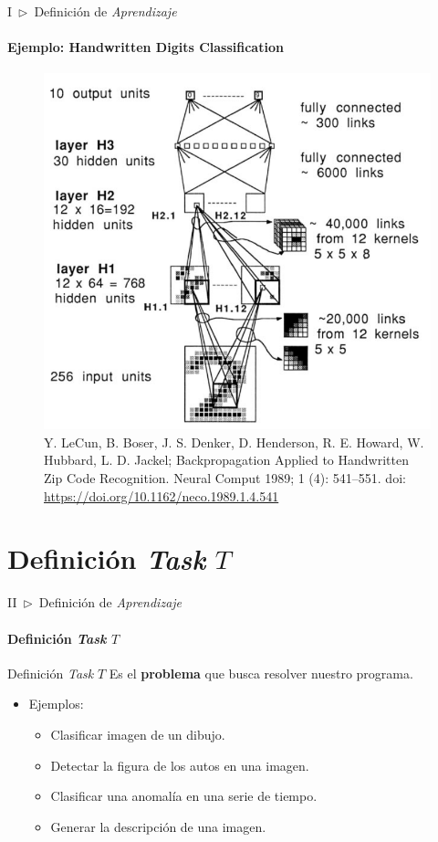 \documentclass[xcolor=dvipsnames]{beamer}
\begin{document}
    \begin{frame}{I~$\rhd$~Definición de \textit{Aprendizaje}}
    \framesubtitle{Ejemplo: Handwritten Digits Classification}
       \begin{figure}
           \centering
           \includegraphics[width=0.5\linewidth]{imgs/sec1/0899-7667-img2.png}
           \caption{\scriptsize{Y. LeCun, B. Boser, J. S. Denker, D. Henderson, R. E. Howard, W. Hubbard, L. D. Jackel; Backpropagation Applied to Handwritten Zip Code Recognition. Neural Comput 1989; 1 (4): 541–551. doi: \url{https://doi.org/10.1162/neco.1989.1.4.541}}}
       \end{figure}
    \end{frame}

    \section{Definición \textit{Task} \( T \)}
    \begin{frame}{II~$\rhd$~Definición de \textit{Aprendizaje}}
    \framesubtitle{Definición \textit{Task} \( T \)}
        \begin{block}{Definición \textit{Task} \( T \)}
        Es el \textbf{problema} que busca resolver nuestro programa.
        \end{block}
        \vspace{5mm}
        \begin{itemize}
            \item Ejemplos:
            \begin{itemize}
                \item Clasificar imagen de un dibujo.
                \item Detectar la figura de los autos en una imagen.
                \item Clasificar una anomalía en una serie de tiempo.
                \item Generar la descripción de una imagen.
            \end{itemize}
        \end{itemize}
    \end{frame}
\end{document}
